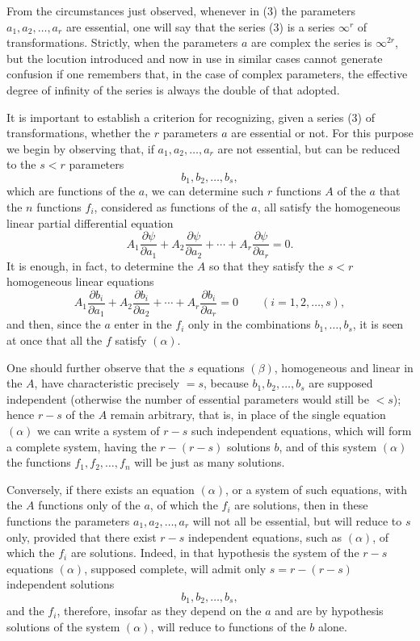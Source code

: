 \documentclass[11pt]{book}
\begin{document}
From the circumstances just observed, whenever in (3) the parameters $a_1,a_2,\ldots,a_r$ are essential, one will say that the series (3) is a series $\infty^r$ of transformations. Strictly, when the parameters $a$ are complex the series is $\infty^{2r}$, but the locution introduced and now in use in similar cases cannot generate confusion if one remembers that, in the case of complex parameters, the effective degree of infinity of the series is always the double of that adopted.

It is important to establish a criterion for recognizing, given a series (3) of transformations, whether the $r$ parameters $a$ are essential or not. For this purpose we begin by observing that, if $a_1,a_2,\ldots,a_r$ are not essential, but can be reduced to the $s<r$ parameters
\[
 b_1,b_2,\ldots,b_s,
\]
which are functions of the $a$, we can determine such $r$ functions $A$ of the $a$ that the $n$ functions $f_i$, considered as functions of the $a$, all satisfy the homogeneous linear partial differential equation
\begin{equation*}\tag{$\alpha$}
 A_1\frac{\partial\psi}{\partial a_1}+A_2\frac{\partial\psi}{\partial a_2}+\cdots+A_r\frac{\partial\psi}{\partial a_r}=0.
\end{equation*}
It is enough, in fact, to determine the $A$ so that they satisfy the $s<r$ homogeneous linear equations
\begin{equation*}\tag{$\beta$}
 A_1\frac{\partial b_i}{\partial a_1}+A_2\frac{\partial b_i}{\partial a_2}+\cdots+A_r\frac{\partial b_i}{\partial a_r}=0\qquad (i=1,2,\ldots,s),
\end{equation*}
and then, since the $a$ enter in the $f_i$ only in the combinations $b_1,\ldots,b_s$, it is seen at once that all the $f$ satisfy $(\alpha)$.

One should further observe that the $s$ equations $(\beta)$, homogeneous and linear in the $A$, have characteristic precisely $=s$, because $b_1,b_2,\ldots,b_s$ are supposed independent (otherwise the number of essential parameters would still be $<s$); hence $r-s$ of the $A$ remain arbitrary, that is, in place of the single equation $(\alpha)$ we can write a system of $r-s$ such independent equations, which will form a complete system, having the $r-(r-s)$ solutions $b$, and of this system $(\alpha)$ the functions $f_1,f_2,\ldots,f_n$ will be just as many solutions.

Conversely, if there exists an equation $(\alpha)$, or a system of such equations, with the $A$ functions only of the $a$, of which the $f_i$ are solutions, then in these functions the parameters $a_1,a_2,\ldots,a_r$ will not all be essential, but will reduce to $s$ only, provided that there exist $r-s$ independent equations, such as $(\alpha)$, of which the $f_i$ are solutions. Indeed, in that hypothesis the system of the $r-s$ equations $(\alpha)$, supposed complete, will admit only $s=r-(r-s)$ independent solutions
\[
 b_1,b_2,\ldots,b_s,
\]
and the $f_i$, therefore, insofar as they depend on the $a$ and are by hypothesis solutions of the system $(\alpha)$, will reduce to functions of the $b$ alone.
\end{document}
